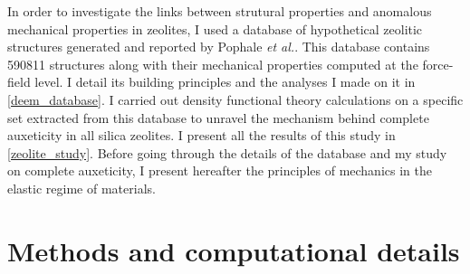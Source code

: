 \documentclass[journal=jacsat,manuscript=article]{achemso}
\begin{document}
In order to investigate the links between strutural properties and anomalous mechanical properties in zeolites, I used a database of hypothetical zeolitic structures generated and reported by Pophale \emph{et al.}.\cite{pophale_database_2011} This database contains 590811 structures along with their mechanical properties computed at the force-field level. I detail its building principles and the analyses I made on it in \ref{deem_database}. I carried out density functional theory calculations on a specific set extracted from this database to unravel the mechanism behind complete auxeticity in all silica zeolites. I present all the results of this study in \ref{zeolite_study}. Before going through the details of the database  and my study on complete auxeticity, I present hereafter the principles of mechanics in the elastic regime of materials.









\section{Methods and computational details}
\end{document}
